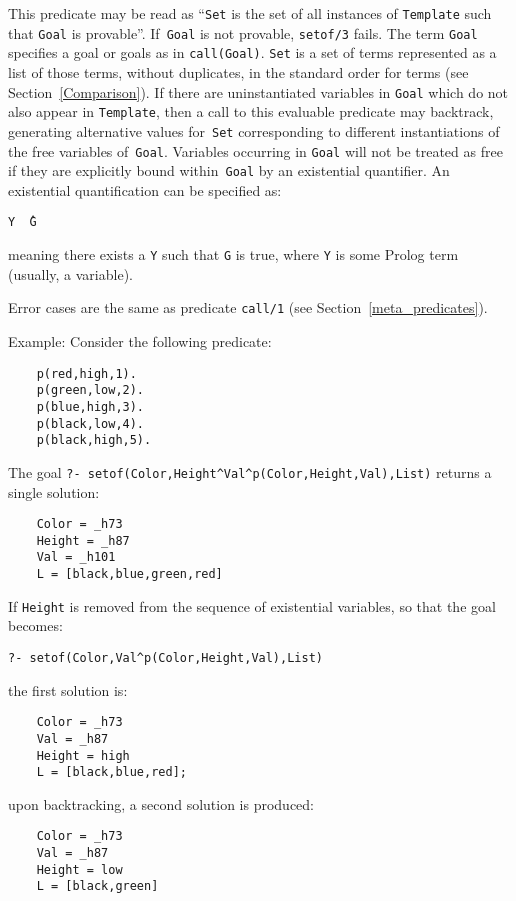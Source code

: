 \begin{description}
    This predicate may be read as ``{\tt Set} is the set of all instances 
    of {\tt Template} such that {\tt Goal} is provable''.
    If~{\tt Goal} is not provable, {\tt setof/3} fails.
    The term {\tt Goal} specifies a goal or goals as in {\tt call(Goal)}.
    {\tt Set} is a set of terms represented as a list of those terms,
    without duplicates, in the standard order for terms 
    (see Section~\ref{Comparison}).
    If there are uninstantiated variables in {\tt Goal} which do not also 
    appear in {\tt Template}, then a call to this evaluable predicate may backtrack,
    generating alternative values for~{\tt Set} corresponding to different
    instantiations of the free variables of~{\tt Goal}.
    Variables occurring in {\tt Goal} will not be treated as free if they 
    are explicitly bound within~{\tt Goal} by an existential quantifier.
    An existential quantification can be specified as:
    \begin{center}
    {\tt Y \^\ G}\index{\^}
    \end{center}
    meaning there exists a {\tt Y} such that {\tt G} is true,
    where {\tt Y} is some Prolog term (usually, a variable).
  
    Error cases are the same as predicate {\tt call/1} (see
    Section~\ref{meta_predicates}).

Example: Consider the following predicate: 
%
\begin{verbatim}
    p(red,high,1).
    p(green,low,2).
    p(blue,high,3).
    p(black,low,4).
    p(black,high,5).
\end{verbatim}
%
The goal \verb|?- setof(Color,Height^Val^p(Color,Height,Val),List)|
returns a single solution:
\begin{verbatim}
    Color = _h73
    Height = _h87
    Val = _h101
    L = [black,blue,green,red]
\end{verbatim}

If {\tt Height} is removed from the sequence of existential variables, so
that the goal becomes:
\begin{verbatim}
?- setof(Color,Val^p(Color,Height,Val),List)
\end{verbatim}
the first solution is:
\begin{verbatim}
    Color = _h73
    Val = _h87
    Height = high
    L = [black,blue,red];
\end{verbatim}
%
upon backtracking, a second solution is produced: 
%
\begin{verbatim}
    Color = _h73
    Val = _h87
    Height = low
    L = [black,green]
\end{verbatim}


\end{description}

